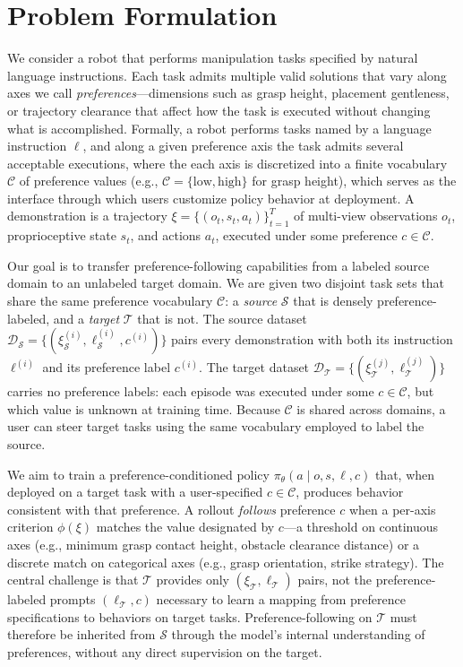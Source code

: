 \documentclass{article}
\begin{document}
\section{Problem Formulation}
\label{sec:formulation}

We consider a robot that performs manipulation tasks specified by natural language instructions.
Each task admits multiple valid solutions that vary along axes we call \emph{preferences}---dimensions such as grasp height, placement gentleness, or trajectory clearance that affect how the task is executed without changing what is accomplished.
Formally, a robot performs tasks named by a language instruction $\ell$, and along a given preference axis the task admits several acceptable executions, where the each axis is discretized into a finite vocabulary $\mathcal{C}$ of preference values (e.g., $\mathcal{C}=\{\mathrm{low},\mathrm{high}\}$ for grasp height), which serves as the interface through which users customize policy behavior at deployment.
  A demonstration is a trajectory $\xi=\{(o_t,s_t,a_t)\}_{t=1}^{T}$ of multi-view observations $o_t$, proprioceptive state $s_t$, and actions $a_t$, executed under some preference $c\in\mathcal{C}$.


Our goal is to transfer preference-following capabilities from a labeled source domain to an unlabeled target domain.
We are given two disjoint task sets that share the same preference vocabulary $\mathcal{C}$: a \emph{source} $\mathcal{S}$ that is densely preference-labeled, and a \emph{target} $\mathcal{T}$ that is not.
The source dataset $\mathcal{D}_{\mathcal{S}}=\{(\xi_{\mathcal{S}}^{(i)},\ell_{\mathcal{S}}^{(i)},c^{(i)})\}$ pairs every demonstration with both its instruction $\ell^{(i)}$ and its preference label $c^{(i)}$.
The target dataset $\mathcal{D}_{\mathcal{T}}=\{(\xi_{\mathcal{T}}^{(j)},\ell_{\mathcal{T}}^{(j)})\}$ carries no preference labels: each episode was executed under some $c\in\mathcal{C}$, but which value is unknown at training time.
Because $\mathcal{C}$ is shared across domains, a user can steer target tasks using the same vocabulary employed to label the source.

We aim to train a preference-conditioned policy $\pi_{\theta}(a\mid o,s,\ell,c)$ that, when deployed on a target task with a user-specified $c\in\mathcal{C}$, produces behavior consistent with that preference.
A rollout \emph{follows} preference $c$ when a per-axis criterion $\phi(\xi)$ matches the value designated by $c$---a threshold on continuous axes (e.g., minimum grasp contact height, obstacle clearance distance) or a discrete match on categorical axes (e.g., grasp orientation, strike strategy).
The central challenge is that $\mathcal{T}$ provides only $(\xi_\mathcal{T},\ell_\mathcal{T})$ pairs, not the preference-labeled prompts $(\ell_\mathcal{T},c)$ necessary to learn a mapping from preference specifications to behaviors on target tasks.
Preference-following on $\mathcal{T}$ must therefore be inherited from $\mathcal{S}$ through the model's internal understanding of preferences, without any direct supervision on the target.
\end{document}
